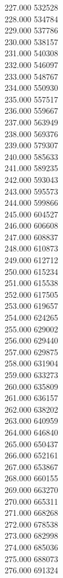 { 227.000	532528 \\
 228.000	534784 \\
 229.000	537786 \\
 230.000	538157 \\
 231.000	540308 \\
 232.000	546097 \\
 233.000	548767 \\
 234.000	550930 \\
 235.000	557517 \\
 236.000	559667 \\
 237.000	563949 \\
 238.000	569376 \\
 239.000	579307 \\
 240.000	585633 \\
 241.000	589235 \\
 242.000	593043 \\
 243.000	595573 \\
 244.000	599866 \\
 245.000	604527 \\
 246.000	606608 \\
 247.000	608837 \\
 248.000	610873 \\
 249.000	612712 \\
 250.000	615234 \\
 251.000	615538 \\
 252.000	617505 \\
 253.000	619657 \\
 254.000	624265 \\
 255.000	629002 \\
 256.000	629440 \\
 257.000	629875 \\
 258.000	631904 \\
 259.000	633273 \\
 260.000	635809 \\
 261.000	636157 \\
 262.000	638202 \\
 263.000	640959 \\
 264.000	646840 \\
 265.000	650437 \\
 266.000	652161 \\
 267.000	653867 \\
 268.000	660155 \\
 269.000	663270 \\
 270.000	665311 \\
 271.000	668268 \\
 272.000	678538 \\
 273.000	682998 \\
 274.000	685036 \\
 275.000	688073 \\
 276.000	691324 \\
}
